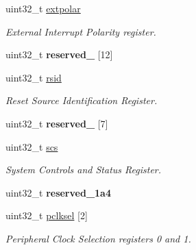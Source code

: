 \begin{DoxyCompactItemize}
uint32\+\_\+t \mbox{\hyperlink{structlpc176x__scb_ada4622f8ba57c18e49606b037db514ed}{extpolar}}
\begin{DoxyCompactList}\small\item\em External Interrupt Polarity register. \end{DoxyCompactList}\item 
\mbox{\label{structlpc176x__scb_a34146cf5f7804c5618f6cffbbe2e500f}} 
uint32\+\_\+t {\bfseries reserved\+\_} \mbox{[}12\mbox{]}
\item 
\mbox{\label{structlpc176x__scb_a6264c6f3058cef0a8ef13222c03d3448}} 
uint32\+\_\+t \mbox{\hyperlink{structlpc176x__scb_a6264c6f3058cef0a8ef13222c03d3448}{rsid}}
\begin{DoxyCompactList}\small\item\em Reset Source Identification Register. \end{DoxyCompactList}\item 
\mbox{\label{structlpc176x__scb_a13524b0e6a1ede61a3f22dec0f5c8338}} 
uint32\+\_\+t {\bfseries reserved\+\_} \mbox{[}7\mbox{]}
\item 
\mbox{\label{structlpc176x__scb_ab22935bed0be60765bfb3b9f0f3aebf6}} 
uint32\+\_\+t \mbox{\hyperlink{structlpc176x__scb_ab22935bed0be60765bfb3b9f0f3aebf6}{scs}}
\begin{DoxyCompactList}\small\item\em System Controls and Status Register. \end{DoxyCompactList}\item 
\mbox{\label{structlpc176x__scb_a1f0f713c1b772031052d62b6fc07ba7a}} 
uint32\+\_\+t {\bfseries reserved\+\_\+1a4}
\item 
\mbox{\label{structlpc176x__scb_ad0551ab2027d7267cfd539a6523cdbaf}} 
uint32\+\_\+t \mbox{\hyperlink{structlpc176x__scb_ad0551ab2027d7267cfd539a6523cdbaf}{pclksel}} \mbox{[}2\mbox{]}
\begin{DoxyCompactList}\small\item\em Peripheral Clock Selection registers 0 and 1. \end{DoxyCompactList}\item 
\mbox{\label{structlpc176x__scb_a4806a2f3f8ca143d7bcb482cb34bac23}} 

\end{DoxyCompactItemize}
